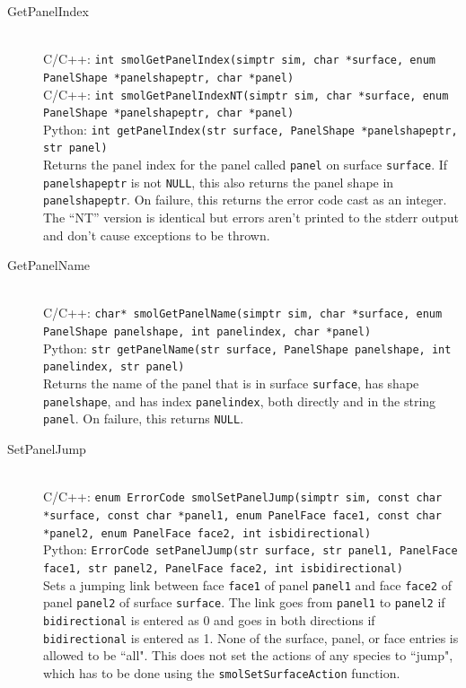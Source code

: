 \documentclass {scrbook}
\newcommand {\ttt} {\texttt}
\begin{document}
\begin{description}
\item[GetPanelIndex]
\hfill \\
C/C++: \ttt{int smolGetPanelIndex(simptr sim, char *surface, enum PanelShape *panelshapeptr, char *panel)}\\
C/C++: \ttt{int smolGetPanelIndexNT(simptr sim, char *surface, enum PanelShape *panelshapeptr, char *panel)}\\
Python: \ttt{int getPanelIndex(str surface, PanelShape *panelshapeptr, str panel)}\\
Returns the panel index for the panel called \ttt{panel} on surface \ttt{surface}. If \ttt{panelshapeptr} is not \ttt{NULL}, this also returns the panel shape in \ttt{panelshapeptr}. On failure, this returns the error code cast as an integer. The ``NT'' version is identical but errors aren't printed to the stderr output and don't cause exceptions to be thrown.

\item[GetPanelName]
\hfill \\
C/C++: \ttt{char* smolGetPanelName(simptr sim, char *surface, enum PanelShape panelshape, int panelindex, char *panel)}\\
Python: \ttt{str getPanelName(str surface, PanelShape panelshape, int panelindex, str panel)}\\
Returns the name of the panel that is in surface \ttt{surface}, has shape \ttt{panelshape}, and has index \ttt{panelindex}, both directly and in the string \ttt{panel}. On failure, this returns \ttt{NULL}.

\item[SetPanelJump]
\hfill \\
C/C++: \ttt{enum ErrorCode smolSetPanelJump(simptr sim, const char *surface, const char *panel1, enum PanelFace face1, const char *panel2, enum PanelFace face2, int isbidirectional)}\\
Python: \ttt{ErrorCode setPanelJump(str surface, str panel1, PanelFace face1, str panel2, PanelFace face2, int isbidirectional)}\\
Sets a jumping link between face \ttt{face1} of panel \ttt{panel1} and face \ttt{face2} of panel \ttt{panel2} of surface \ttt{surface}. The link goes from \ttt{panel1} to \ttt{panel2} if \ttt{bidirectional} is entered as 0 and goes in both directions if \ttt{bidirectional} is entered as 1. None of the surface, panel, or face entries is allowed to be ``all". This does not set the actions of any species to ``jump", which has to be done using the \ttt{smolSetSurfaceAction} function.


\end{description}
\end{document}
